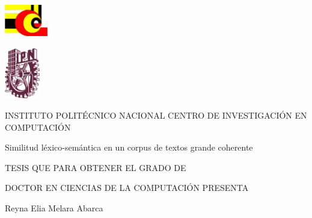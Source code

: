 \documentclass[letterpaper]{article}
\title{}
\author{Reyna }
\date{2013-12-10}
\begin{document}
\clearpage\setcounter{page}{1}\pagestyle{Standard}


\begin{center}
\includegraphics[width=1.88cm,height=1.469cm]{Capitulo2-img1.jpg}
\end{center}
\begin{center}
\includegraphics[width=1.538cm,height=2.205cm]{Capitulo2-img2.png}
\end{center}

\bigskip


\bigskip


\bigskip


\bigskip


\bigskip

{\centering{}\sffamily
INSTITUTO POLIT\'ECNICO NACIONAL CENTRO DE INVESTIGACI\'ON EN
COMPUTACI\'ON
\par}


\bigskip


\bigskip


\bigskip


\bigskip

{\centering{}\sffamily
Similitud l\'exico-sem\'antica en un corpus de textos grande coherente
\par}


\bigskip

{\sffamily
TESIS QUE PARA OBTENER EL GRADO DE}

{\sffamily
DOCTOR EN CIENCIAS DE LA COMPUTACI\'ON PRESENTA}


\bigskip


\bigskip

{\centering{}\sffamily
Reyna Elia Melara Abarca
\par}


\bigskip


\bigskip


\bigskip


\bigskip


\bigskip
\end{document}
